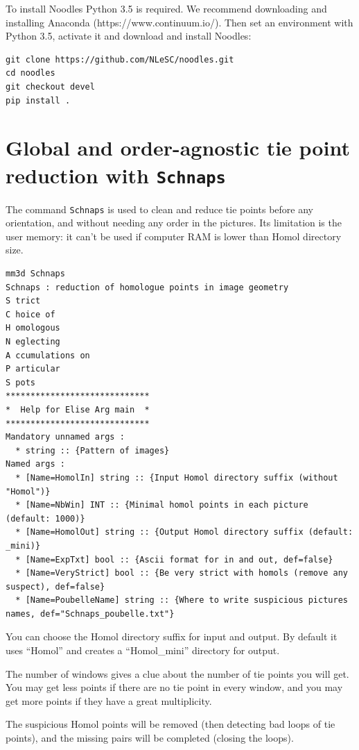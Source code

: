 To install Noodles Python 3.5 is required. We recommend downloading and installing Anaconda (https://www.continuum.io/). Then set an environment with Python 3.5, activate it and download and install Noodles:
\begin{verbatim}
git clone https://github.com/NLeSC/noodles.git
cd noodles
git checkout devel
pip install .
\end{verbatim}


\section{Global and order-agnostic tie point reduction with {\tt Schnaps}}
The command {\tt Schnaps} is used to clean and reduce tie points before any orientation, and without needing any order in the pictures.
Its limitation is the user memory: it can't be used if computer RAM is lower than Homol directory size.

\begin{verbatim}
mm3d Schnaps
Schnaps : reduction of homologue points in image geometry
S trict           
C hoice of        
H omologous       
N eglecting       
A ccumulations on 
P articular       
S pots
*****************************
*  Help for Elise Arg main  *
*****************************
Mandatory unnamed args : 
  * string :: {Pattern of images}
Named args : 
  * [Name=HomolIn] string :: {Input Homol directory suffix (without "Homol")}
  * [Name=NbWin] INT :: {Minimal homol points in each picture (default: 1000)}
  * [Name=HomolOut] string :: {Output Homol directory suffix (default: _mini)}
  * [Name=ExpTxt] bool :: {Ascii format for in and out, def=false}
  * [Name=VeryStrict] bool :: {Be very strict with homols (remove any suspect), def=false}
  * [Name=PoubelleName] string :: {Where to write suspicious pictures names, def="Schnaps_poubelle.txt"}
\end{verbatim}

You can choose the Homol directory suffix for input and output. By default it uses ``Homol'' and creates a ``Homol\_mini'' directory for output.

The number of windows gives a clue about the number of tie points you will get.
You may get less points if there are no tie point in every window, and you may get more points if they have a great multiplicity.

The suspicious Homol points will be removed (then detecting bad loops of tie points), and the missing pairs will be completed (closing the loops).


